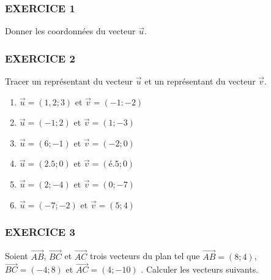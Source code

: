 \documentclass[10pt]{article}
\begin{document}
\setlength{\columnseprule}{1pt}

\subsubsection*{EXERCICE 1}

Donner les coordonnées du vecteur $\overrightarrow{u}$.

\begin{figure}[H]
  \centering
\end{figure}

\subsubsection*{EXERCICE 2}

Tracer un représentant du vecteur $\overrightarrow{u}$ et un représentant du vecteur $\overrightarrow{v}$.

\begin{figure}[H]
  \centering
\end{figure}

\begin{multicols}{2}
  \begin{enumerate}
  \item $\overrightarrow{u} = ( 1,2 ;  3)$ et $\overrightarrow{v} = (-1   : -2)$
  \item $\overrightarrow{u} = ( -1   ; 2)$ et $\overrightarrow{v} = (1    ; -3)$
  \item $\overrightarrow{u} = ( 6   ; -1)$ et $\overrightarrow{v} = ( -2  ;  0)$
  \item $\overrightarrow{u} = ( 2.5 ;  0)$ et $\overrightarrow{v} = ( é.5 ;  0)$
  \item $\overrightarrow{u} = ( 2   ; -4)$ et $\overrightarrow{v} = ( 0   ; -7)$
  \item $\overrightarrow{u} = ( -7  ; -2)$ et $\overrightarrow{v} = ( 5   ;  4)$
  \end{enumerate}
\end{multicols}

\subsubsection*{EXERCICE 3}
Soient $\overrightarrow{AB}$, $\overrightarrow{BC}$ et $\overrightarrow{AC}$ trois vecteurs du plan tel que $\overrightarrow{AB} = (8 ; 4)$, $\overrightarrow{BC} = (-4 ; 8)$ et $\overrightarrow{AC} = (4 ; -10)$   . Calculer les vecteurs suivants.
\end{document}
